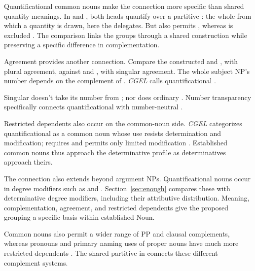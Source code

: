 \documentclass[12pt]{article}
\begin{document}
Quantificational common nouns make the connection more specific than shared quantity meanings. In  and , both heads quantify over a partitive : the whole from which a quantity is drawn, here the delegates. But  also permits , whereas  is excluded \citep[349]{huddleston2002}. The comparison links the groups through a shared construction while preserving a specific difference in complementation.

Agreement provides another connection. Compare the constructed  and , with plural agreement, against  and , with singular agreement. The whole subject NP's number depends on the complement of . \textit{CGEL} calls quantificational   \citep[349--350, 411--412]{huddleston2002}.

Singular  doesn't take its number from ; nor does ordinary . Number transparency specifically connects quantificational  with number-neutral .

Restricted dependents also occur on the common-noun side. \textit{CGEL} categorizes quantificational  as a common noun whose use resists determination and modification;  requires  and permits only limited modification \citep[349--350]{huddleston2002}. Established common nouns thus approach the determinative profile as determinatives approach theirs.

The connection also extends beyond argument NPs. Quantificational nouns occur in degree modifiers such as  and  \citep[549--550]{huddleston2002}. Section~\ref{sec:enough} compares these with determinative degree modifiers, including their attributive distribution. Meaning, complementation, agreement, and restricted dependents give the proposed grouping a specific basis within established Noun.

Common nouns also permit a wider range of PP and clausal complements, whereas pronouns and primary naming uses of proper nouns have much more restricted dependents \citep[429--430, 439--443, 517--521]{huddleston2002}. The shared partitive in  connects these different complement systems.
\end{document}
